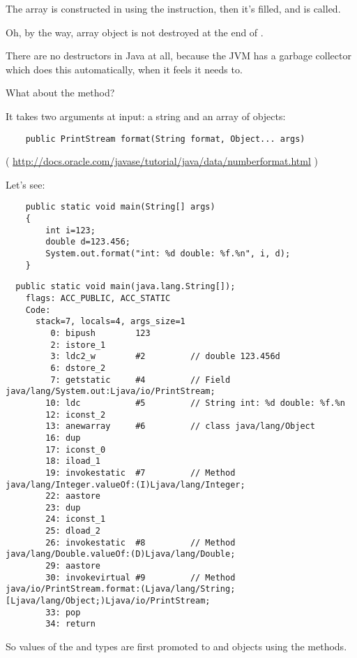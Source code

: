 The array is constructed in \main using the  instruction, 
then it's filled, and \ttf is called.


Oh, by the way, array object is not destroyed at the end of \main.

There are no destructors in Java at all, because the JVM has a garbage collector which does this
automatically, when it feels it needs to.


What about the  method?

It takes two arguments at input: a string and an array of objects:


\begin{lstlisting}
	public PrintStream format(String format, Object... args)
\end{lstlisting}
( \url{http://docs.oracle.com/javase/tutorial/java/data/numberformat.html} )

Let's see:

\begin{lstlisting}
	public static void main(String[] args)
	{
		int i=123;
		double d=123.456;
		System.out.format("int: %d double: %f.%n", i, d);
	}
\end{lstlisting}

\begin{lstlisting}
  public static void main(java.lang.String[]);
    flags: ACC_PUBLIC, ACC_STATIC
    Code:
      stack=7, locals=4, args_size=1
         0: bipush        123
         2: istore_1      
         3: ldc2_w        #2         // double 123.456d
         6: dstore_2      
         7: getstatic     #4         // Field java/lang/System.out:Ljava/io/PrintStream;
        10: ldc           #5         // String int: %d double: %f.%n
        12: iconst_2      
        13: anewarray     #6         // class java/lang/Object
        16: dup           
        17: iconst_0      
        18: iload_1       
        19: invokestatic  #7         // Method java/lang/Integer.valueOf:(I)Ljava/lang/Integer;
        22: aastore       
        23: dup           
        24: iconst_1      
        25: dload_2       
        26: invokestatic  #8         // Method java/lang/Double.valueOf:(D)Ljava/lang/Double;
        29: aastore       
        30: invokevirtual #9         // Method java/io/PrintStream.format:(Ljava/lang/String;[Ljava/lang/Object;)Ljava/io/PrintStream;
        33: pop           
        34: return        
\end{lstlisting}

So values of the  and  types are first promoted to  and  
objects using the  methods.

